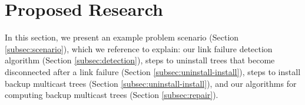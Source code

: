 
















\section{Proposed Research}
\label{sec:proposed}

In this section, we present an example problem scenario (Section \ref{subsec:scenario}), which we reference to explain: our link failure detection algorithm (Section \ref{subsec:detection}),
steps to uninstall trees that become disconnected after a link failure (Section \ref{subsec:uninstall-install}), steps to install backup multicast trees (Section \ref{subsec:uninstall-install}),
and our algorithms for computing backup multicast trees (Section \ref{subsec:repair}).






